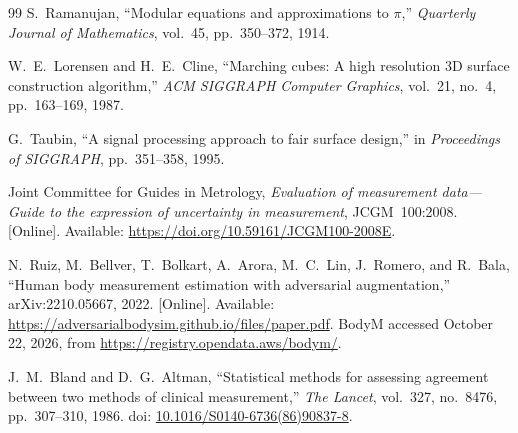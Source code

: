 \documentclass[11pt,a4paper]{article}
\begin{document}
\begin{thebibliography}{99}
S.~Ramanujan, ``Modular equations and approximations to $\pi$,'' \emph{Quarterly Journal of Mathematics}, vol.~45, pp.~350--372, 1914.

W.~E.~Lorensen and H.~E.~Cline, ``Marching cubes: A high resolution 3D surface construction algorithm,'' \emph{ACM SIGGRAPH Computer Graphics}, vol.~21, no.~4, pp.~163--169, 1987.

G.~Taubin, ``A signal processing approach to fair surface design,'' in \emph{Proceedings of SIGGRAPH}, pp.~351--358, 1995.

Joint Committee for Guides in Metrology, \emph{Evaluation of measurement data---Guide to the expression of uncertainty in measurement}, JCGM~100:2008. [Online]. Available: \url{https://doi.org/10.59161/JCGM100-2008E}.

N.~Ruiz, M.~Bellver, T.~Bolkart, A.~Arora, M.~C.~Lin, J.~Romero, and R.~Bala, ``Human body measurement estimation with adversarial augmentation,'' arXiv:2210.05667, 2022. [Online]. Available: \url{https://adversarialbodysim.github.io/files/paper.pdf}. BodyM accessed October 22, 2026, from \url{https://registry.opendata.aws/bodym/}.

J.~M.~Bland and D.~G.~Altman, ``Statistical methods for assessing agreement between two methods of clinical measurement,'' \emph{The Lancet}, vol.~327, no.~8476, pp.~307--310, 1986. doi: \href{https://doi.org/10.1016/S0140-6736(86)90837-8}{10.1016/S0140-6736(86)90837-8}.
\end{thebibliography}
\end{document}
